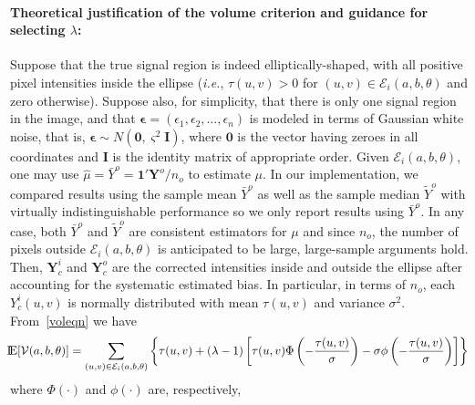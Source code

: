\documentclass[12pt]{article}
\newcommand{\bepsilon}{\boldsymbol{\epsilon}}
\newcommand{\bI}{\boldsymbol{I}}
\newcommand{\bY}{\boldsymbol{Y}}
\newcommand{\bzero}{\boldsymbol{0}}
\newcommand{\bone}{\boldsymbol{1}}
\newcommand{\mE}{\mathcal E}
\newcommand{\mV}{\mathcal V}
\newcommand{\E}{\mbox{I\!E}}
\begin{document}
\paragraph{Theoretical justification of the volume criterion and
  guidance for selecting $\lambda$:}
 Suppose that the true signal region is  indeed  elliptically-shaped,
 with  all positive pixel intensities  inside the ellipse ({\em i.e.},
 $\tau(u,v) > 0$ for  $(u,v)\in\mE_i(a,b,\theta)$ and
 zero otherwise). Suppose also, for simplicity, that there is only one
 signal region in the image, and that $\bepsilon =
 (\epsilon_1,\epsilon_2,\ldots,\epsilon_n)$ is  modeled in terms
 of Gaussian  white noise, that is,  $\bepsilon\sim N(\bzero,
 \varsigma^2\bI)$, where $\bzero$ is the vector having zeroes in all
 coordinates and $\bI$ is the identity matrix of appropriate order.
  Given $\mE_i(a,b,\theta)$, one may use $\hat\mu =\bar Y^o =
\bone'\bY^o/n_o$ to estimate $\mu$. In our implementation, we
compared results using the sample mean $\bar Y^o$ as well as the
sample median $\tilde Y^o$ with virtually indistinguishable
performance so we only report  results using $\bar Y^o$. 
In any case, both $\bar Y^o$ and $\tilde Y^o$ are consistent
estimators for $\mu$ and since $n_o$, the number of pixels outside
$\mE_i(a,b,\theta)$ is anticipated to be large, large-sample
arguments hold. Then, $\bY_c^i$ and $\bY_c^o$ are the corrected
intensities inside and outside the ellipse after accounting for the
systematic estimated bias. In particular, in terms of $n_o$, each
$Y_c^i(u,v)$ is %
normally  distributed with mean $\tau(u,v)$ and %
variance $\sigma^2$. 
From~\eqref{voleqn} %
we have 
\begin{equation}
\hspace{-1mm}  \E[\mV(a,b,\theta)] = \sum_{(u,v)\in\mE_i(a,b,\theta)} \left\{\tau(u,v)
    + (\lambda-1) \left[\tau(u,v) \Phi\left(-\frac{\tau(u,v)}{\sigma}\right) -
      \sigma\phi\left(-\frac{\tau(u,v)}{\sigma}\right)\right]\right\}
\label{expvol}         
\end{equation}
where $\Phi(\cdot)$ and $\phi(\cdot)$ are, respectively,
\end{document}
